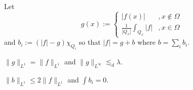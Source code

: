 \documentclass{../../large}
\begin{document}
\begin{prb}
Let
\[g(x):=\begin{cases}|f(x)|&,x\notin\Omega\\\frac1{|Q_x|}\int_{Q_x}|f|&,x\in\Omega\end{cases}\]
and $b_i:=(|f|-g)\chi_{Q_i}$ so that $|f|=g+b$ where $b=\sum_ib_i$.
\begin{parts}
\item $\|g\|_{L^1}=\|f\|_{L^1}$ and $\|g\|_{L^\infty}\lesssim_d\lambda$.
\item $\|b\|_{L^1}\le2\|f\|_{L^1}$ and $\int b_i=0$.
\end{parts}
\end{prb}
\begin{pf}

\end{pf}
\end{document}

